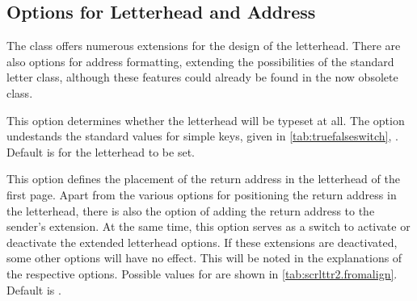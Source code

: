 \subsection{Options for Letterhead and Address}
\label{sec:scrlttr2.headoptions}
%

The  class offers numerous extensions for the design
of the letterhead.  There are also options for address formatting,
extending the possibilities of the standard letter class, although
these features could already be found in the now obsolete
 class.

\begin{Declaration}
\end{Declaration}
%
This option determines whether the
letterhead will be typeset at all. The option undestands the standard
values for simple keys, given
in \autoref{tab:truefalseswitch},
. Default is for the
letterhead to be set.
%

\begin{Declaration}
\end{Declaration}
%
This option defines the placement of the return address in the
letterhead of the first page. Apart from the various options for
positioning the return address in the letterhead, there is also the
option of adding the return
address to the sender's
extension. At the same
time, this option serves as a switch to activate or deactivate the
extended letterhead options. If these extensions are deactivated, some
other options will have no effect. This will be noted in the
explanations of the respective options. Possible values for
 are shown in
\autoref{tab:scrlttr2.fromalign}. Default is .

